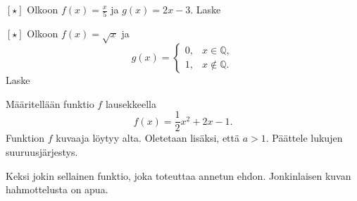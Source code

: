 \begin{tehtavasivu}
\begin{tehtava}$\boldsymbol{[\star]}$
  Olkoon $f(x)=\frac{x}{5}$ ja $g(x)=2x-3$. Laske
  \begin{vastaus}
  \end{vastaus}
\end{tehtava}

\begin{tehtava}$\boldsymbol{[\star]}$ %
	Olkoon $f(x) =\sqrt{x} $ 
	ja 
	\begin{equation*}
	g(x)=
		\begin{cases}
		  0, & x \in \mathbb{Q},\\
		  1, & x \notin \mathbb{Q}.
		\end{cases}
	\end{equation*}
	Laske
	
    \begin{vastaus}
    \end{vastaus}
\end{tehtava}

\begin{tehtava}
	Määritellään funktio $f$ lausekkeella \[f(x)=\frac{1}{2}x^2+2x-1.\] Funktion $f$ kuvaaja löytyy alta. 
	Oletetaan lisäksi, että $a>1$. Päättele lukujen suuruusjärjestys.
    \begin{vastaus}
    \end{vastaus}
\end{tehtava}
\vspace{1cm}
\begin{center}
	\begin{kuvaajapohja}{0.7}{-3}{7}{-5}{3}
	\end{kuvaajapohja}
\end{center}

\begin{tehtava} Keksi jokin sellainen funktio, joka toteuttaa annetun ehdon. Jonkinlaisen kuvan hahmottelusta on apua.
    \begin{vastaus}
    \end{vastaus}

\end{tehtava}



\end{tehtavasivu}
